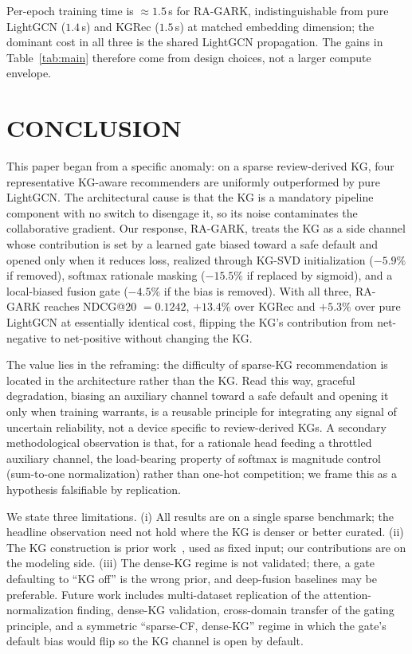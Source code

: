 \documentclass[12pt,a4paper]{article}
\begin{document}
Per-epoch training time is $\approx 1.5$\,s for RA-GARK, indistinguishable from pure LightGCN ($1.4$\,s) and KGRec ($1.5$\,s) at matched embedding dimension; the dominant cost in all three is the shared LightGCN propagation. The gains in Table~\ref{tab:main} therefore come from design choices, not a larger compute envelope.

\section{CONCLUSION}
\label{sec:conclude}

This paper began from a specific anomaly: on a sparse review-derived KG, four representative KG-aware recommenders are uniformly outperformed by pure LightGCN. The architectural cause is that the KG is a mandatory pipeline component with no switch to disengage it, so its noise contaminates the collaborative gradient. Our response, RA-GARK, treats the KG as a side channel whose contribution is set by a learned gate biased toward a safe default and opened only when it reduces loss, realized through KG-SVD initialization ($-5.9\%$ if removed), softmax rationale masking ($-15.5\%$ if replaced by sigmoid), and a local-biased fusion gate ($-4.5\%$ if the bias is removed). With all three, RA-GARK reaches NDCG@20 $=0.1242$, $+13.4\%$ over KGRec and $+5.3\%$ over pure LightGCN at essentially identical cost, flipping the KG's contribution from net-negative to net-positive without changing the KG.

The value lies in the reframing: the difficulty of sparse-KG recommendation is located in the architecture rather than the KG. Read this way, graceful degradation, biasing an auxiliary channel toward a safe default and opening it only when training warrants, is a reusable principle for integrating any signal of uncertain reliability, not a device specific to review-derived KGs. A secondary methodological observation is that, for a rationale head feeding a throttled auxiliary channel, the load-bearing property of softmax is magnitude control (sum-to-one normalization) rather than one-hot competition; we frame this as a hypothesis falsifiable by replication.

We state three limitations. (i) All results are on a single sparse benchmark; the headline observation need not hold where the KG is denser or better curated. (ii) The KG construction is prior work~\cite{ho2024reviewkg}, used as fixed input; our contributions are on the modeling side. (iii) The dense-KG regime is not validated; there, a gate defaulting to ``KG off'' is the wrong prior, and deep-fusion baselines may be preferable. Future work includes multi-dataset replication of the attention-normalization finding, dense-KG validation, cross-domain transfer of the gating principle, and a symmetric ``sparse-CF, dense-KG'' regime in which the gate's default bias would flip so the KG channel is open by default.
\end{document}

